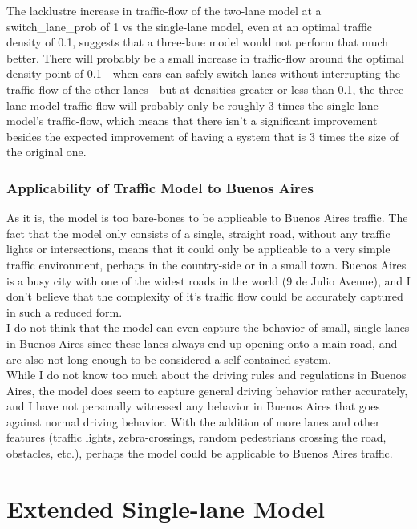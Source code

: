 \documentclass[11pt]{article}
\begin{document}
The lacklustre increase in traffic-flow of the two-lane model at a
switch\_lane\_prob of 1 vs the single-lane model, even at an optimal
traffic density of 0.1, suggests that a three-lane model would not
perform that much better. There will probably be a small increase in
traffic-flow around the optimal density point of 0.1 - when cars can
safely switch lanes without interrupting the traffic-flow of the other
lanes - but at densities greater or less than 0.1, the three-lane model
traffic-flow will probably only be roughly 3 times the single-lane
model's traffic-flow, which means that there isn't a significant
improvement besides the expected improvement of having a system that is
3 times the size of the original one.\\

\subsubsection{Applicability of Traffic Model to Buenos Aires}

As it is, the model is too bare-bones to be applicable to Buenos Aires
traffic. The fact that the model only consists of a single, straight
road, without any traffic lights or intersections, means that it could
only be applicable to a very simple traffic environment, perhaps in the
country-side or in a small town. Buenos Aires is a busy city with one of
the widest roads in the world (9 de Julio Avenue), and I don't believe
that the complexity of it's traffic flow could be accurately captured in
such a reduced form.\\

I do not think that the model can even capture the behavior of small,
single lanes in Buenos Aires since these lanes always end up opening
onto a main road, and are also not long enough to be considered a
self-contained system.\\

While I do not know too much about the driving rules and regulations in
Buenos Aires, the model does seem to capture general driving behavior
rather accurately, and I have not personally witnessed any behavior in
Buenos Aires that goes against normal driving behavior. With the
addition of more lanes and other features (traffic lights,
zebra-crossings, random pedestrians crossing the road, obstacles, etc.),
perhaps the model could be applicable to Buenos Aires traffic.\\

\section{Extended Single-lane Model}
\end{document}
